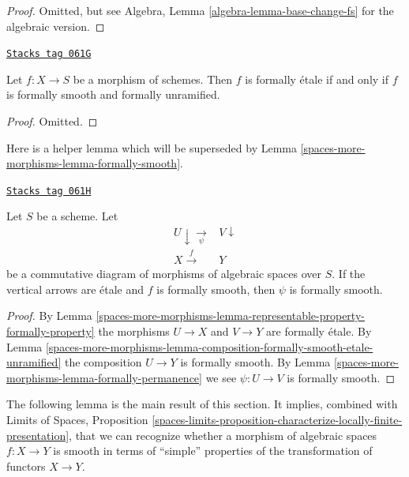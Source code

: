\begin{proof}
Omitted, but see
Algebra, Lemma \ref{algebra-lemma-base-change-fs}
for the algebraic version.
\end{proof}

\begin{lemma}
\label{spaces-more-morphisms-lemma-formally-etale-unramified-smooth}
\href{https://stacks.math.columbia.edu/tag/061G}{\texttt{Stacks tag 061G}}

Let $f : X \to S$ be a morphism of schemes.
Then $f$ is formally \'etale if and only if
$f$ is formally smooth and formally unramified.
\end{lemma}

\begin{proof}
Omitted.
\end{proof}

Here is a helper lemma which will be superseded by
Lemma \ref{spaces-more-morphisms-lemma-formally-smooth}.

\begin{lemma}
\label{spaces-more-morphisms-lemma-helper-formally-smooth}
\href{https://stacks.math.columbia.edu/tag/061H}{\texttt{Stacks tag 061H}}

Let $S$ be a scheme. Let
$$
\begin{array}{cc}U \downarrow\underset{\psi}{\longrightarrow} & V \downarrow \\ X \overset{f}{\longrightarrow} & Y\end{array}
$$
be a commutative diagram of morphisms of algebraic spaces over $S$.
If the vertical arrows are \'etale and $f$ is formally smooth, then
$\psi$ is formally smooth.
\end{lemma}

\begin{proof}
By
Lemma \ref{spaces-more-morphisms-lemma-representable-property-formally-property}
the morphisms $U \to X$ and $V \to Y$ are formally \'etale. By
Lemma \ref{spaces-more-morphisms-lemma-composition-formally-smooth-etale-unramified}
the composition $U \to Y$ is formally smooth. By
Lemma \ref{spaces-more-morphisms-lemma-formally-permanence}
we see $\psi : U \to V$ is formally smooth.
\end{proof}

The following lemma is the main result of this section.
It implies, combined with
Limits of Spaces, Proposition
\ref{spaces-limits-proposition-characterize-locally-finite-presentation},
that we can recognize whether a morphism of algebraic spaces
$f : X \to Y$ is smooth in terms of ``simple'' properties of the
transformation of functors $X \to Y$.

